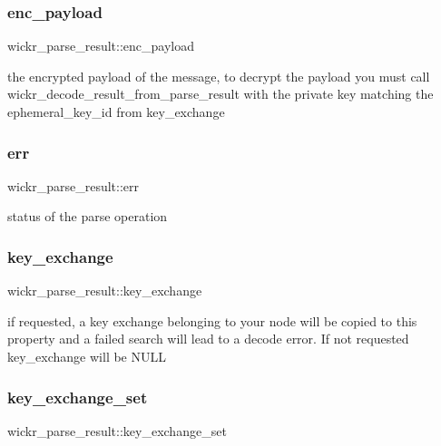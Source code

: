 \subsubsection{\texorpdfstring{enc\+\_\+payload}{enc\_payload}}
{\footnotesize\ttfamily wickr\+\_\+parse\+\_\+result\+::enc\+\_\+payload}

the encrypted payload of the message, to decrypt the payload you must call \textquotesingle{}wickr\+\_\+decode\+\_\+result\+\_\+from\+\_\+parse\+\_\+result\textquotesingle{} with the private key matching the \textquotesingle{}ephemeral\+\_\+key\+\_\+id\textquotesingle{} from \textquotesingle{}key\+\_\+exchange\textquotesingle{} \mbox{\label{structwickr__parse__result_a69a3ee332921b4fdbc0e07dbfa74a8ed}} 
\subsubsection{\texorpdfstring{err}{err}}
{\footnotesize\ttfamily wickr\+\_\+parse\+\_\+result\+::err}

status of the parse operation \mbox{\label{structwickr__parse__result_ab33e5d00121c229280bbee814ca7ef5a}} 
\subsubsection{\texorpdfstring{key\+\_\+exchange}{key\_exchange}}
{\footnotesize\ttfamily wickr\+\_\+parse\+\_\+result\+::key\+\_\+exchange}

if requested, a key exchange belonging to your node will be copied to this property and a failed search will lead to a decode error. If not requested key\+\_\+exchange will be N\+U\+LL \mbox{\label{structwickr__parse__result_aa35f9328b675b02426fd190ffcd45402}} 
\subsubsection{\texorpdfstring{key\+\_\+exchange\+\_\+set}{key\_exchange\_set}}
{\footnotesize\ttfamily wickr\+\_\+parse\+\_\+result\+::key\+\_\+exchange\+\_\+set}

